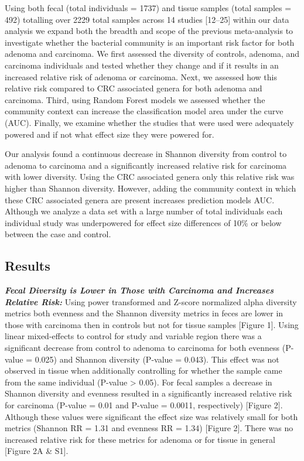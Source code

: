 \documentclass[12pt,]{article}
\begin{document}
Using both fecal (total individuals = 1737) and tissue samples (total
samples = 492) totalling over 2229 total samples across 14 studies
{[}12--25{]} within our data analysis we expand both the breadth and
scope of the previous meta-analysis to investigate whether the bacterial
community is an important risk factor for both adenoma and carcinoma. We
first assessed the diversity of controls, adenoma, and carcinoma
individuals and tested whether they change and if it results in an
increased relative risk of adenoma or carcinoma. Next, we assessed how
this relative risk compared to CRC associated genera for both adenoma
and carcinoma. Third, using Random Forest models we assessed whether the
community context can increase the classification model area under the
curve (AUC). Finally, we examine whether the studies that were used were
adequately powered and if not what effect size they were powered for.

Our analysis found a continuous decrease in Shannon diversity from
control to adenoma to carcinoma and a significantly increased relative
risk for carcinoma with lower diversity. Using the CRC associated genera
only this relative risk was higher than Shannon diversity. However,
adding the community context in which these CRC associated genera are
present increases prediction models AUC. Although we analyze a data set
with a large number of total individuals each individual study was
underpowered for effect size differences of 10\% or below between the
case and control.

\newpage

\subsection{Results}\label{results}

\textbf{\emph{Fecal Diversity is Lower in Those with Carcinoma and
Increases Relative Risk:}} Using power transformed and Z-score
normalized alpha diversity metrics both evenness and the Shannon
diversity metrics in feces are lower in those with carcinoma then in
controls but not for tissue samples {[}Figure 1{]}. Using linear
mixed-effects to control for study and variable region there was a
significant decrease from control to adenoma to carcinoma for both
evenness (P-value = 0.025) and Shannon diversity (P-value = 0.043). This
effect was not observed in tissue when additionally controlling for
whether the sample came from the same individual (P-value \textgreater{}
0.05). For fecal samples a decrease in Shannon diversity and evenness
resulted in a significantly increased relative risk for carcinoma
(P-value = 0.01 and P-value = 0.0011, respectively) {[}Figure 2{]}.
Although these values were significant the effect size was relatively
small for both metrics (Shannon RR = 1.31 and evenness RR = 1.34)
{[}Figure 2{]}. There was no increased relative risk for these metrics
for adenoma or for tissue in general {[}Figure 2A \& S1{]}.
\end{document}
